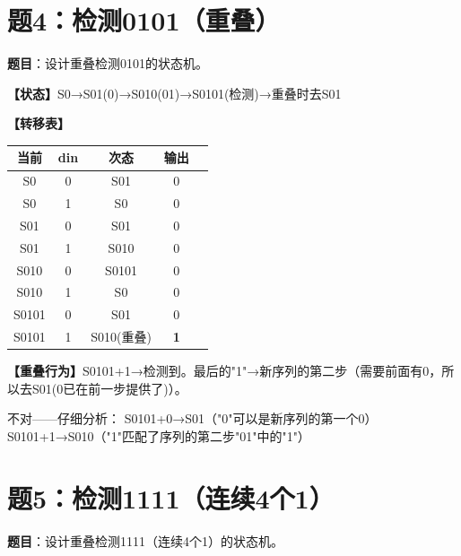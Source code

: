 \section{题4：检测0101（重叠）}

\textbf{题目}：设计重叠检测0101的状态机。

\begin{solution}[完整解答]

\textbf{【状态】}S0→S01(0)→S010(01)→S0101(检测)→重叠时去S01

\textbf{【转移表】}
\begin{center}
\begin{tabular}{|c|c|c||c|c|}\hline
当前 & din & 次态 & 输出 \\ \hline
S0 & 0 & S01 & 0 \\ \hline S0 & 1 & S0 & 0 \\ \hline
S01 & 0 & S01 & 0 \\ \hline S01 & 1 & S010 & 0 \\ \hline
S010 & 0 & S0101 & 0 \\ \hline S010 & 1 & S0 & 0 \\ \hline
S0101 & 0 & S01 & 0 \\ \hline S0101 & 1 & S010(重叠) & \textbf{1} \\ \hline
\end{tabular}
\end{center}

\textbf{【重叠行为】}S0101+1→检测到。最后的"1"→新序列的第二步（需要前面有0，所以去S01(0已在前一步提供了)）。

不对——仔细分析：
S0101+0→S01（"0"可以是新序列的第一个0）
S0101+1→S010（"1"匹配了序列的第二步"01"中的"1"）

\end{solution}


\section{题5：检测1111（连续4个1）}

\textbf{题目}：设计重叠检测1111（连续4个1）的状态机。

